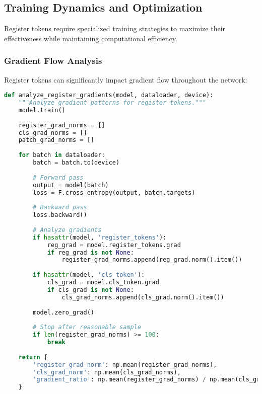 \subsection{Training Dynamics and Optimization}

Register tokens require specialized training strategies to maximize their effectiveness while maintaining computational efficiency.

\subsubsection{Gradient Flow Analysis}

Register tokens can significantly impact gradient flow throughout the network:

\begin{lstlisting}[language=Python, caption=Register token gradient analysis during training]
def analyze_register_gradients(model, dataloader, device):
    """Analyze gradient patterns for register tokens."""
    model.train()
    
    register_grad_norms = []
    cls_grad_norms = []
    patch_grad_norms = []
    
    for batch in dataloader:
        batch = batch.to(device)
        
        # Forward pass
        output = model(batch)
        loss = F.cross_entropy(output, batch.targets)
        
        # Backward pass
        loss.backward()
        
        # Analyze gradients
        if hasattr(model, 'register_tokens'):
            reg_grad = model.register_tokens.grad
            if reg_grad is not None:
                register_grad_norms.append(reg_grad.norm().item())
        
        if hasattr(model, 'cls_token'):
            cls_grad = model.cls_token.grad
            if cls_grad is not None:
                cls_grad_norms.append(cls_grad.norm().item())
        
        model.zero_grad()
        
        # Stop after reasonable sample
        if len(register_grad_norms) >= 100:
            break
    
    return {
        'register_grad_norm': np.mean(register_grad_norms),
        'cls_grad_norm': np.mean(cls_grad_norms),
        'gradient_ratio': np.mean(register_grad_norms) / np.mean(cls_grad_norms)
    }
\end{lstlisting}

